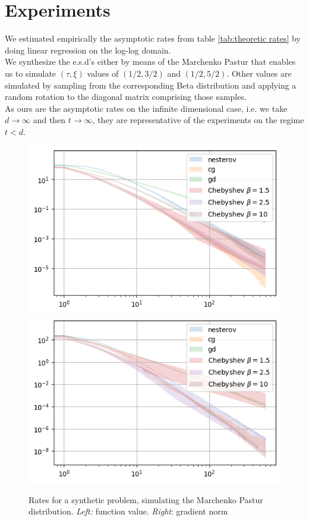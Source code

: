 \documentclass{article}
\begin{document}
\section{Experiments}
We estimated empirically the asymptotic rates from table \ref{tab:theoretic rates} by doing linear regression on the log-log domain. \\
We synthesize the e.s.d's  either by means of the Marchenko Pastur that enables us to simulate $(\tau,\xi)$ values of $(1/2,3/2)$ and $(1/2,5/2)$. Other values are simulated by sampling from the corresponding Beta distribution and applying a random rotation to the diagonal matrix comprising those samples.\\ 
As ours are the asymptotic rates on the infinite dimensional case, i.e. we take $d\rightarrow \infty$ and then $t \rightarrow \infty$, they are representative of the experiments on the regime $t<d$.

\begin{figure}[H]
    \centering
    \includegraphics[width=5 cm]{imgs/mp/log f.png}\includegraphics[width= 5 cm]{imgs/mp/log grad.png}
    
    
    \caption{Rates for a synthetic problem, simulating the Marchenko Pastur distribution. \textit{Left:} function value. \textit{Right}: gradient norm}
    \label{fig:my_label}
\end{figure}
\end{document}
